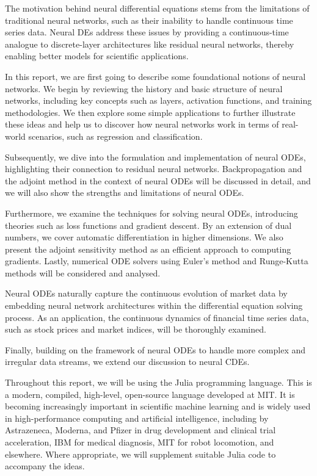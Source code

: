 \documentclass[a4paper,11pt,titlepage]{article}
\theoremstyle{definition}
\theoremstyle{plain}
\theoremstyle{remark}
\begin{document}
The motivation behind neural differential equations stems from the limitations of traditional neural networks, such as their inability to handle continuous time series data. Neural DEs address these issues by providing a continuous-time analogue to discrete-layer architectures like residual neural networks, thereby enabling better models for scientific applications.

In this report, we are first going to describe some foundational notions of neural networks. We begin by reviewing the history and basic structure of neural networks, including key concepts such as layers, activation functions, and training methodologies. We then explore some simple applications to further illustrate these ideas and help us to discover how neural networks work in terms of real-world scenarios, such as regression and classification.

Subsequently, we dive into the formulation and implementation of neural ODEs, highlighting their connection to residual neural networks. Backpropagation and the adjoint method in the context of neural ODEs will be discussed in detail, and we will also show the strengths and limitations of neural ODEs.

Furthermore, we examine the techniques for solving neural ODEs, introducing theories such as loss functions and gradient descent. By an extension of dual numbers, we cover automatic differentiation in higher dimensions. We also present the adjoint sensitivity method as an efficient approach to computing gradients. Lastly, numerical ODE solvers using Euler's method and Runge-Kutta methods will be considered and analysed.

Neural ODEs naturally capture the continuous evolution of market data by embedding neural network architectures within the differential equation solving process. As an application, the continuous dynamics of financial time series data, such as stock prices and market indices, will be thoroughly examined.

Finally, building on the framework of neural ODEs to handle more complex and irregular data streams, we extend our discussion to neural CDEs.

Throughout this report, we will be using the Julia programming language. This is a modern, compiled, high-level, open-source language developed at MIT. It is becoming increasingly important in scientific machine learning and is widely used in high-performance computing and artificial intelligence, including by Astrazeneca, Moderna, and Pfizer in drug development and clinical trial acceleration, IBM for medical diagnosis, MIT for robot locomotion, and elsewhere. Where appropriate, we will supplement suitable Julia code to accompany the ideas.
\end{document}

